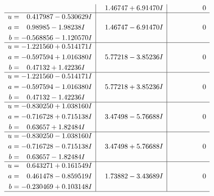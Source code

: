 \documentclass[1p]{elsarticle_modified}
\theoremstyle{definition}
\begin{document}
$$\begin{array}{c|c|c}
 & \phantom{-}1.46747 + 6.91470 I & \phantom{-0.000000 } 0 \\ \hline\begin{aligned}
u &= \phantom{-}0.417987 - 0.530629 I \\
a &= \phantom{-}0.98985 - 1.98238 I \\
b &= -0.568856 - 1.120570 I\end{aligned}
 & \phantom{-}1.46747 - 6.91470 I & \phantom{-0.000000 } 0 \\ \hline\begin{aligned}
u &= -1.221560 + 0.514171 I \\
a &= -0.597594 + 1.016380 I \\
b &= \phantom{-}0.47132 + 1.42236 I\end{aligned}
 & \phantom{-}5.77218 - 3.85236 I & \phantom{-0.000000 } 0 \\ \hline\begin{aligned}
u &= -1.221560 - 0.514171 I \\
a &= -0.597594 - 1.016380 I \\
b &= \phantom{-}0.47132 - 1.42236 I\end{aligned}
 & \phantom{-}5.77218 + 3.85236 I & \phantom{-0.000000 } 0 \\ \hline\begin{aligned}
u &= -0.830250 + 1.038160 I \\
a &= -0.716728 + 0.715138 I \\
b &= \phantom{-}0.63657 + 1.82484 I\end{aligned}
 & \phantom{-}3.47498 - 5.76688 I & \phantom{-0.000000 } 0 \\ \hline\begin{aligned}
u &= -0.830250 - 1.038160 I \\
a &= -0.716728 - 0.715138 I \\
b &= \phantom{-}0.63657 - 1.82484 I\end{aligned}
 & \phantom{-}3.47498 + 5.76688 I & \phantom{-0.000000 } 0 \\ \hline\begin{aligned}
u &= \phantom{-}0.643271 + 0.161549 I \\
a &= \phantom{-}0.461478 - 0.859519 I \\
b &= -0.230469 + 0.103148 I\end{aligned}
 & \phantom{-}1.73882 - 3.43689 I & \phantom{-0.000000 } 0\\
 \hline 
 \end{array}$$\newpage$$\begin{array}{c|c|c}  

\end{array}$$
\end{document}
